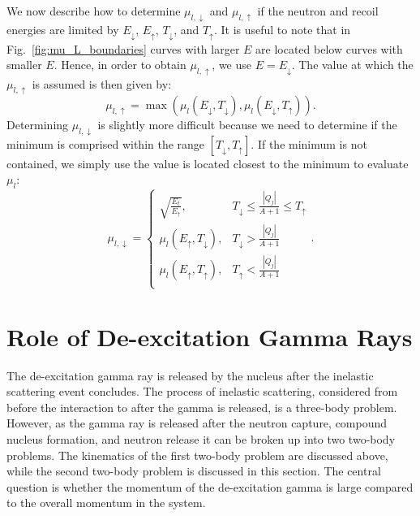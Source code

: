 \documentclass[review]{elsarticle}
\begin{document}
We now describe how to determine $\mu_{l,\downarrow}$ and $\mu_{l,\uparrow}$ if the neutron and recoil energies are limited by $E_{\downarrow}$, $E_{\uparrow}$, $T_{\downarrow}$, and $T_{\uparrow}$. It is useful to note that in Fig.~\ref{fig:mu_L_boundaries} curves with larger $E$ are located below curves with smaller $E$. Hence, in order to obtain $\mu_{l,\uparrow}$, we use $E=E_{\downarrow}$. The value at which the $\mu_{l,\uparrow}$ is assumed is then given by:
\begin{equation}
 \mu_{l,\uparrow} = \max \left(  \mu_l(E_{\downarrow},T_{\downarrow}), \mu_l(E_{\downarrow},T_{\uparrow}) \right).
\end{equation}
Determining $\mu_{l, \downarrow}$ is slightly more difficult because we need to determine if the minimum is comprised within the range $[T_{\downarrow}, T_{\uparrow}]$. If the minimum is not contained, we simply use the value is located closest to the minimum to evaluate $\mu_l$:
\begin{equation} \label{eq:mu_L_min}       
 \mu_{l,\downarrow}  = \left\{ \begin{array}{ll}
         \sqrt{\frac{E_t}{E_{\uparrow}}}, & T_{\downarrow}\le \frac{|Q_j|}{A+1} \le T_{\uparrow}\\
         \mu_l(E_{\uparrow}, T_{\downarrow}), &  T_{\downarrow} >\frac{|Q_j|}{A+1} \\
         \mu_l(E_{\uparrow}, T_{\uparrow}), &  T_{\uparrow} <\frac{|Q_j|}{A+1} \\ 
         \end{array}
         \right .    .
\end{equation}         
\section{Role of De-excitation Gamma Rays}
The de-excitation gamma ray is released by the nucleus after the inelastic scattering event concludes. The process of inelastic scattering, considered from before the interaction to after the gamma is released, is a three-body problem. However, as the gamma ray is released after the neutron capture, compound nucleus formation, and neutron release it can be broken up into two two-body problems. The kinematics of the first two-body problem are discussed above, while the second two-body problem is discussed in this section. The central question is whether the momentum of the de-excitation gamma is large compared to the overall momentum in the system. 
\end{document}
